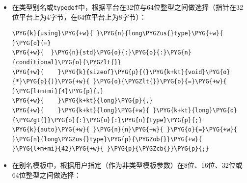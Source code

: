 \begin{itemize}
\item 在类型别名或\texttt{typedef}中，根据平台在32位与64位整型之间做选择（指针在32位平台上为4字节，在64位平台上为8字节）：



\begin{codeblockbg}
\begin{Verbatim}[commandchars=\\\{\},breaklines=true,breakanywhere=true,fontsize=\codefont,xleftmargin=17bp]
\PYG{k}{using}\PYG{+w}{ }\PYG{n}{long\PYGZus{}type}\PYG{+w}{ }\PYG{o}{=}
\PYG{+w}{  }\PYG{n}{std}\PYG{o}{:}\PYG{o}{:}\PYG{n}{conditional}\PYG{o}{\PYGZlt{}}
\PYG{+w}{    }\PYG{k}{sizeof}\PYG{p}{(}\PYG{k+kt}{void}\PYG{o}{*}\PYG{p}{)}\PYG{+w}{ }\PYG{o}{\PYGZlt{}}\PYG{o}{=}\PYG{+w}{ }\PYG{l+m+mi}{4}\PYG{p}{,}
\PYG{+w}{    }\PYG{k+kt}{long}\PYG{p}{,}
\PYG{+w}{    }\PYG{k+kt}{long}\PYG{+w}{ }\PYG{k+kt}{long}\PYG{o}{\PYGZgt{}}\PYG{o}{:}\PYG{o}{:}\PYG{n}{type}\PYG{p}{;}
\PYG{k}{auto}\PYG{+w}{ }\PYG{n}{n}\PYG{+w}{ }\PYG{o}{=}\PYG{+w}{ }\PYG{n}{long\PYGZus{}type}\PYG{p}{\PYGZob{}}\PYG{+w}{ }\PYG{l+m+mi}{42}\PYG{+w}{ }\PYG{p}{\PYGZcb{}}\PYG{p}{;}
\end{Verbatim}
\end{codeblockbg}



\item 在别名模板中，根据用户指定（作为非类型模板参数）在8位、16位、32位或64位整型之间做选择：



\end{itemize}
